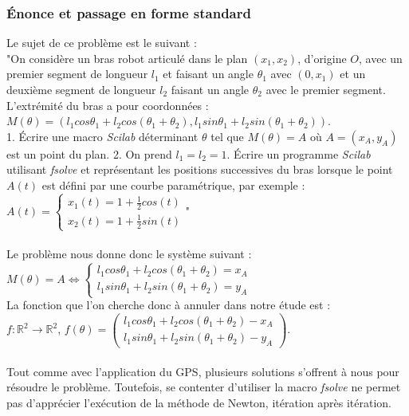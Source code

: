 \documentclass[a4paper,10pt]{report}
\begin{document}
\subsubsection{Énonce et passage en forme standard}
Le sujet de ce problème est le suivant :\\
\indent "On considère un bras robot articulé dans le plan $(x_1,x_2)$, d’origine $O$, avec un premier segment de longueur $l_1$ et faisant un angle $\theta_1$ avec $(0,x_1)$ et un deuxième segment de longueur $l_2$ faisant un angle $\theta_2$ avec le premier segment. L’extrémité du bras a pour coordonnées :\\
$M(\theta) = (l_1 cos \theta_1 + l_2 cos(\theta_1 + \theta_2 ), l_1 sin \theta_1 + l_2 sin(\theta_1 + \theta_2 ))$.\\
1. Écrire une macro \textit{Scilab} déterminant $\theta$ tel que $M(\theta) = A$ où $A=(x_A,y_A)$ est un point du plan.
2. On prend $l_1 = l_2 = 1$. Écrire un programme \textit{Scilab} utilisant \textit{fsolve} et représentant les positions successives du bras lorsque le point $A(t)$ est défini par une courbe paramétrique, par exemple :\\
$A(t) = \left\lbrace \begin{array}{c} x_1(t)=1+\frac{1}{2}cos(t) \\ x_2(t)=1+\frac{1}{2}sin(t) \end{array} \right.$"\\
\\
\indent Le problème nous donne donc le système suivant :\\
$M(\theta)=A \Leftrightarrow
\left\lbrace
\begin{array}{l}
l_1 cos \theta_1 + l_2 cos(\theta_1 + \theta_2 ) = x_A \\
l_1 sin \theta_1 + l_2 sin(\theta_1 + \theta_2 ) = y_A
\end{array}\right.
$\\
La fonction que l'on cherche donc à annuler dans notre étude est :\\
$f: \mathbb{R}^2 \longrightarrow \mathbb{R}^2$, $f(\theta)=\left( \begin{array}{c} l_1 cos \theta_1 + l_2 cos(\theta_1 + \theta_2 ) - x_A \\ l_1 sin \theta_1 + l_2 sin(\theta_1 + \theta_2 ) - y_A  \end{array} \right)$.\\
\\
Tout comme avec l'application du GPS, plusieurs solutions s'offrent à nous pour résoudre le problème. Toutefois, se contenter d'utiliser la macro \textit{fsolve} ne permet pas d'apprécier l'exécution de la méthode de Newton, itération après itération.
\end{document}
